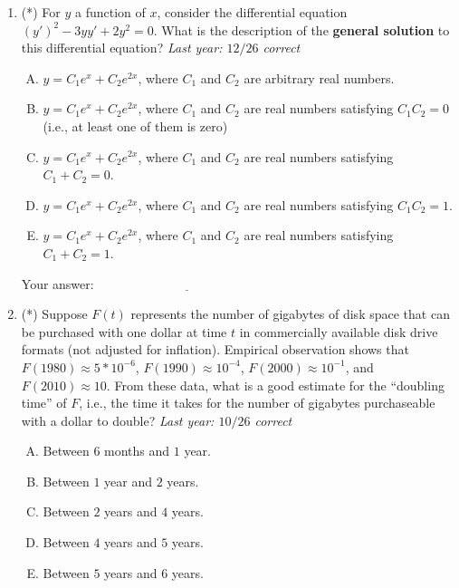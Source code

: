 \documentclass[10pt]{amsart}
\begin{document}
\begin{enumerate}
\item (*) For $y$ a function of $x$, consider the differential
  equation $(y')^2 - 3yy' + 2y^2 = 0$. What is the description of the
  {\bf general solution} to this differential equation? {\em Last
  year: $12/26$ correct}

  \begin{enumerate}[(A)]
  \item $y = C_1e^x + C_2e^{2x}$, where $C_1$ and $C_2$ are arbitrary
    real numbers.
  \item $y = C_1e^x + C_2e^{2x}$, where $C_1$ and $C_2$ are real
    numbers satisfying $C_1C_2 = 0$ (i.e., at least one of them is
    zero)
  \item $y = C_1e^x + C_2e^{2x}$, where $C_1$ and $C_2$ are real
    numbers satisfying $C_1 + C_2 = 0$.
  \item $y = C_1e^x + C_2e^{2x}$, where $C_1$ and $C_2$ are real
    numbers satisfying $C_1C_2 = 1$.
  \item $y = C_1e^x + C_2e^{2x}$, where $C_1$ and $C_2$ are real
    numbers satisfying $C_1 + C_2 = 1$.
  \end{enumerate}

  \vspace{0.1in}
  Your answer: $\underline{\qquad\qquad\qquad\qquad\qquad\qquad\qquad}$
  \vspace{0.15in}

\item (*) Suppose $F(t)$ represents the number of gigabytes of disk
  space that can be purchased with one dollar at time $t$ in
  commercially available disk drive formats (not adjusted for
  inflation). Empirical observation shows that $F(1980) \approx 5 *
  10^{-6}$, $F(1990) \approx 10^{-4}$, $F(2000) \approx 10^{-1}$, and
  $F(2010) \approx 10$. From these data, what is a good estimate for
  the ``doubling time'' of $F$, i.e., the time it takes for the number
  of gigabytes purchaseable with a dollar to double? {\em Last year:
  $10/26$ correct}
  \begin{enumerate}[(A)]
  \item Between $6$ months and $1$ year.
  \item Between $1$ year and $2$ years.
  \item Between $2$ years and $4$ years.
  \item Between $4$ years and $5$ years.
  \item Between $5$ years and $6$ years.
  \end{enumerate}


\end{enumerate}
\end{document}
